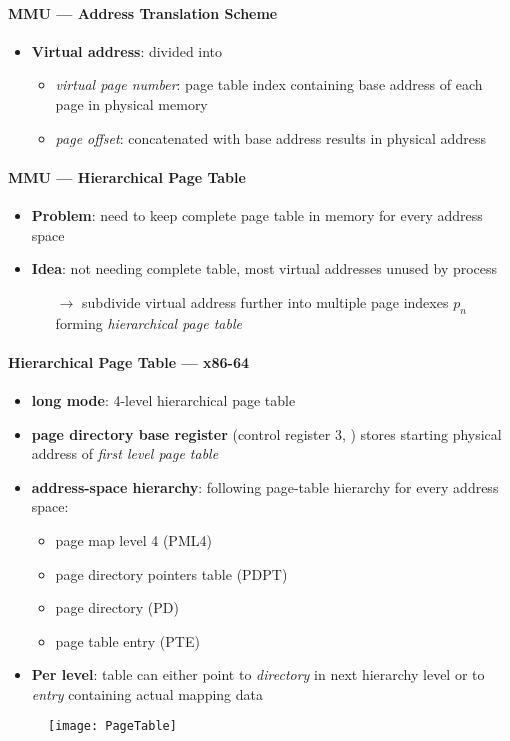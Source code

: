 \paragraph{MMU --- Address Translation Scheme}
\begin{itemize}
  \item \textbf{Virtual address}: divided into
  \begin{itemize}
    \item \emph{virtual page number}: page table index containing base address of each page in physical memory
    \item \emph{page offset}: concatenated with base address results in physical address
  \end{itemize}
\end{itemize}

\paragraph{MMU --- Hierarchical Page Table}
\begin{itemize}
  \item \textbf{Problem}: need to keep complete page table in memory for every address space
  \item \textbf{Idea}: not needing complete table, most virtual addresses unused by process
  \begin{itemize}
    \item[$ \to $] subdivide virtual address further into multiple page indexes \( p_n \) forming \emph{hierarchical page table}
  \end{itemize}
\end{itemize}

\paragraph{Hierarchical Page Table --- x86-64}
\begin{itemize}
  \item \textbf{long mode}: 4-level hierarchical page table
  \item \textbf{page directory base register} (control register 3, ) stores starting physical address of \emph{first level page table}
  \item \textbf{address-space hierarchy}: following page-table hierarchy for every address space:
  \begin{itemize}
    \item page map level 4 (PML4)
    \item page directory pointers table (PDPT)
    \item page directory (PD)
    \item page table entry (PTE)
  \end{itemize}
  \item \textbf{Per level}: table can either point to \emph{directory} in next hierarchy level or to \emph{entry} containing actual mapping data
\end{itemize}
\begin{figure}[h]\centering\label{PageTable}\texttt{[image: PageTable]}\end{figure}

